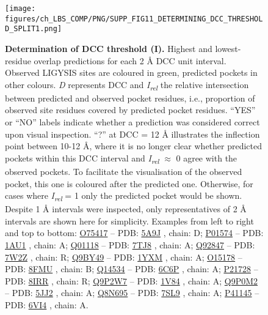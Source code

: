 \begin{figure}[p]
    \centering
    \texttt{[image: figures/ch\_LBS\_COMP/PNG/SUPP\_FIG11\_DETERMINING\_DCC\_THRESHOLD\_SPLIT1.png]}
    \caption[Determination of DCC threshold (I)]{\textbf{Determination of DCC threshold (I).} Highest and lowest-residue overlap predictions for each 2 \AA{} DCC unit interval. Observed LIGYSIS sites are coloured in green, predicted pockets in other colours. \textit{D} represents DCC and \textit{I\textsubscript{rel}} the relative intersection between predicted and observed pocket residues, i.e., proportion of observed site residues covered by predicted pocket residues. ``YES'' or ``NO'' labels indicate whether a prediction was considered correct upon visual inspection. ``?'' at DCC = 12 \AA{} illustrates the inflection point between 10-12 \AA{}, where it is no longer clear whether predicted pockets within this DCC interval and \textit{I\textsubscript{rel}} $\approx$ 0 agree with the observed pockets. To facilitate the visualisation of the observed pocket, this one is coloured after the predicted one. Otherwise, for cases where \textit{I\textsubscript{rel}} = 1 only the predicted pocket would be shown. Despite 1 \AA{} intervals were inspected, only representatives of 2 \AA{} intervals are shown here for simplicity. Examples from left to right and top to bottom: \href{https://www.uniprot.org/uniprotkb/O75417/entry}{O75417} -- PDB: \href{https://www.ebi.ac.uk/pdbe/entry/pdb/5A9J}{5A9J} \cite{NEWMAN_2015_POLYMERASE}, chain: D; \href{https://www.uniprot.org/uniprotkb/P01574/entry}{P01574} -- PDB: \href{https://www.ebi.ac.uk/pdbe/entry/pdb/1AU1}{1AU1} \cite{KARPUSAS_1997_INTERFERON}, chain: A; \href{https://www.uniprot.org/uniprotkb/Q01118/entry}{Q01118} -- PDB: \href{https://www.ebi.ac.uk/pdbe/entry/pdb/7TJ8}{7TJ8} \cite{NOLAND_2022_NAX}, chain: A; \href{https://www.uniprot.org/uniprotkb/Q92847/entry}{Q92847} -- PDB: \href{https://www.ebi.ac.uk/pdbe/entry/pdb/7W2Z}{7W2Z} \cite{QIN_2022_GHRELIN}, chain: R; \href{https://www.uniprot.org/uniprotkb/Q9BY49/entry}{Q9BY49} -- PDB: \href{https://www.ebi.ac.uk/pdbe/entry/pdb/1YXM}{1YXM} \cite{PDB_1YXM}, chain: A; \href{https://www.uniprot.org/uniprotkb/O15178/entry}{O15178} -- PDB: \href{https://www.ebi.ac.uk/pdbe/entry/pdb/8FMU}{8FMU} \cite{CHASE_2024_BRACHYURY}, chain: B; \href{https://www.uniprot.org/uniprotkb/Q14534/entry}{Q14534} -- PDB: \href{https://www.ebi.ac.uk/pdbe/entry/pdb/6C6P}{6C6P} \cite{PADYANA_2019_EPOXIDASE}, chain: A; \href{https://www.uniprot.org/uniprotkb/P21728/entry}{P21728} -- PDB: \href{https://www.ebi.ac.uk/pdbe/entry/pdb/8IRR}{8IRR} \cite{XU_2023_DOPAMINE}, chain: R; \href{https://www.uniprot.org/uniprotkb/Q9P2W7/entry}{Q9P2W7} -- PDB: \href{https://www.ebi.ac.uk/pdbe/entry/pdb/1V84}{1V84} \cite{KAKUDA_2004_GLCATP}, chain: A; \href{https://www.uniprot.org/uniprotkb/Q9P0M2/entry}{Q9P0M2} -- PDB: \href{https://www.ebi.ac.uk/pdbe/entry/pdb/5JJ2}{5JJ2} \cite{BJERREGAARD_2016_AKAP18}, chain: A; \href{https://www.uniprot.org/uniprotkb/Q8N695/entry}{Q8N695} -- PDB: \href{https://www.ebi.ac.uk/pdbe/entry/pdb/7SL9}{7SL9} \cite{HAN_2022_SGLT}, chain: A; \href{https://www.uniprot.org/uniprotkb/P41145/entry}{P41145} -- PDB: \href{https://www.ebi.ac.uk/pdbe/entry/pdb/6VI4}{6VI4} \cite{CHE_2020_NANOBODY}, chain: A.}
    \label{fig:DCC_determination1}
\end{figure}

